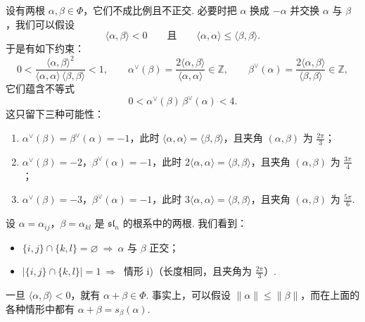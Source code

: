 \begin{numpara}[两根之间的约束]\label{np:lie-2-6-3}
设有两根 $\alpha,\beta\in\Phi$，它们不成比例且不正交. 必要时把 $\alpha$ 换成 $-\alpha$ 并交换 $\alpha$ 与 $\beta$，我们可以假设
\[
\langle\alpha,\beta\rangle<0
\qquad\text{且}\qquad
\langle\alpha,\alpha\rangle\leqslant\langle\beta,\beta\rangle.
\]
于是有如下约束：
\[
0<\frac{\langle\alpha,\beta\rangle^{2}}{\langle\alpha,\alpha\rangle\,\langle\beta,\beta\rangle}<1,
\qquad
\alpha^{\vee}(\beta)=\frac{2\langle\alpha,\beta\rangle}{\langle\alpha,\alpha\rangle}\in\mathbb Z,
\qquad
\beta^{\vee}(\alpha)=\frac{2\langle\alpha,\beta\rangle}{\langle\beta,\beta\rangle}\in\mathbb Z,
\]
它们蕴含不等式
\[
0<\alpha^{\vee}(\beta)\,\beta^{\vee}(\alpha)<4.
\]
这只留下三种可能性：
\begin{enumerate}[label=\roman*)]
\item $\alpha^{\vee}(\beta)=\beta^{\vee}(\alpha)=-1$，此时 $\langle\alpha,\alpha\rangle=\langle\beta,\beta\rangle$，且夹角 $(\alpha,\beta)$ 为 $\frac{2\pi}{3}$；
\item $\alpha^{\vee}(\beta)=-2$，$\beta^{\vee}(\alpha)=-1$，此时 $2\langle\alpha,\alpha\rangle=\langle\beta,\beta\rangle$，且夹角 $(\alpha,\beta)$ 为 $\frac{3\pi}{4}$；
\item $\alpha^{\vee}(\beta)=-3$，$\beta^{\vee}(\alpha)=-1$，此时 $3\langle\alpha,\alpha\rangle=\langle\beta,\beta\rangle$，且夹角 $(\alpha,\beta)$ 为 $\frac{5\pi}{6}$.
\end{enumerate}
\begin{example*}
设 $\alpha=\alpha_{ij}$，$\beta=\alpha_{kl}$ 是 $\mathfrak{sl}_{n}$ 的根系中的两根. 我们看到：
\begin{itemize}
\item $\{i,j\}\cap\{k,l\}=\varnothing\ \Longrightarrow\ \alpha$ 与 $\beta$ 正交；
\item $|\{i,j\}\cap\{k,l\}|=1\ \Longrightarrow\ $ 情形 i)（长度相同，且夹角为 $\frac{2\pi}{3}$）.
\end{itemize}
\end{example*}
\begin{remark*}
一旦 $\langle\alpha,\beta\rangle<0$，就有 $\alpha+\beta\in\Phi$. 事实上，可以假设 $\|\alpha\|\leqslant\|\beta\|$，而在上面的各种情形中都有 $\alpha+\beta=s_{\beta}(\alpha)$.
\end{remark*}
\end{numpara}

